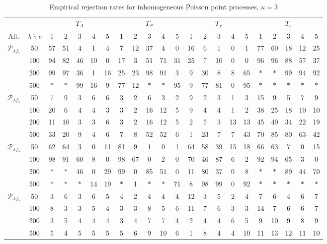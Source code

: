 \documentclass[12pt]{article}
\begin{document}
\begin{table}[p]
\centering
\caption{Empirical rejection rates for inhomogeneous Poisson point processes, $\kappa=3$}\label{tab:kappa3}
\renewcommand{\tabcolsep}{1.7mm}
\small
\begin{tabular}{c|c|ccccc|ccccc|ccccc|ccccc}
\multicolumn{2}{c}{} & \multicolumn{5}{c}{$T_A$} & \multicolumn{5}{c}{$T_P$} & \multicolumn{5}{c}{$T_\chi$} & \multicolumn{5}{c}{$T_c$} \\
Alt. & $\lambda\backslash c$ & 1 & 2 & 3 & 4 & 5 & 1 & 2 & 3 & 4 & 5 & 1 & 2 & 3 & 4 & 5 &1 & 2 & 3 & 4 & 5\\ \hline
\multirow{ 4}{*}{$\mathcal{P}_{\lambda f_1}$}
& 50   & 57 & 51 &  4 & 1 & 4 & 7 & 12 & 37 & 4 & 0 & 16 & 6 & 1 & 0 & 1 & 77 & 60 & 18 & 12 & 25 \\
& 100  & 94 & 82 & 46 & 10 &  0 & 17 &  3 & 51 & 71 & 31 & 25 &  7 & 10 & 0 &  0 & 96     & 96    & 88 & 57 & 37\\
& 200  & 99 & 97 & 36 &  1 & 16 & 25 & 23 & 98 & 91 &  3 &  9 & 30 &  8 & 8 & 65 & $\ast$ & $\ast$& 99 & 94 & 92\\
& 500  & $\ast$ & $\ast$ & 99 & 16 & 9  & 77 & 12 & $\ast$ & $\ast$ & 95 & 9 & 77 & 81  & 0 & 95 & $\ast$ & $\ast$ & $\ast$ & $\ast$ & $\ast$ \\
\hline
\multirow{ 4}{*}{$\mathcal{P}_{\lambda f_2}$}
& 50   & 7  & 9  & 3 & 6 & 6 & 3 & 2 & 6 & 3 & 2 & 9 & 2 & 3 & 1 & 3 & 15 & 9  & 5 & 7  & 9 \\
& 100  & 20 & 6 & 4 & 4 & 3 & 3 & 2 & 16  & 12 & 5 & 9 & 4 & 4 & 1 & 2 & 38 & 25 & 18 & 10  & 10 \\
& 200  & 11 & 10 & 3 & 3 & 6 & 3 & 2 & 16 & 12 & 5 & 2 & 5 & 3 & 13 & 13 & 45 & 49& 34 & 22 & 19 \\
& 500  & 33 & 20 & 9 & 4 & 6 & 7 & 8 & 52 & 52 & 6 & 1 & 23 & 7  & 7  &43  & 70 & 85 & 80 & 63 & 42 \\
\hline
\multirow{ 4}{*}{$\mathcal{P}_{\lambda f_3}$}
& 50   & 62 & 64 & 3 &0 &11  & 81 & 9 & 1 & 0 & 1 & 64 & 58 & 39 & 15 & 18 & 66 & 63 & 7 & 0 & 15\\
& 100  & 98 & 91 & 60 & 8 & 0 & 98 & 67 & 0 & 2 & 0 & 70 & 46 & 87 & 6 & 2 & 92 & 94 & 65 & 3 & 0\\
& 200  & $\ast$& $\ast$ & 46& 0 & 29 & 99& 0& 85& 51& 0& 11& 80&37 &0 &8 &$\ast$ &$\ast$ &89 &44 &70 \\
& 500  & $\ast$ & $\ast$& $\ast$& 14& 19& $\ast$& 1& $\ast$ & $\ast$&  71& 8 & 98& 99& 0& 92 &$\ast$ & $\ast$&$\ast$ &$\ast$ &$\ast$ \\
\hline
\multirow{ 4}{*}{$\mathcal{P}_{\lambda f_4}$}
& 50   & 3& 6& 3& 6& 5& 4& 2& 4& 4& 4& 12& 3& 5& 2& 4& 7& 6& 4& 6& 7\\
& 100  & 8& 3& 3& 5& 4& 3& 3& 8& 5& 6& 11& 7& 6& 3& 3& 14& 7& 6& 6& 7\\
& 200  & 3& 5& 4& 4& 4& 3& 4& 7& 7& 4& 2& 4& 4& 6& 5& 9& 10& 9& 8& 9\\
& 500  & 5& 4& 5& 5& 5& 5& 6& 9& 10& 6& 1& 8& 4& 4& 10& 11&13 &12 &11 &10 \\
\hline
\end{tabular}
\end{table}
\end{document}
